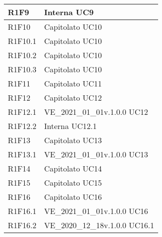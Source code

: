 \begin{center}
\begin{longtable}{|p{22mm}|p{44mm}|}
R1F9 &
Interna \newline
UC9 
\\
\hline

R1F10 &
Capitolato \newline
UC10 
\\
\hline

R1F10.1 &
Capitolato \newline
UC10 
\\
\hline

R1F10.2 &
Capitolato \newline
UC10 
\\
\hline

R1F10.3 &
Capitolato \newline
UC10 
\\
\hline

R1F11 &
Capitolato \newline
UC11 
\\
\hline

R1F12 &
Capitolato \newline
UC12 
\\
\hline

R1F12.1 &
VE\_2021\_01\_01v.1.0.0 \newline
UC12 
\\
\hline

R1F12.2 &
Interna \newline
UC12.1 
\\
\hline

R1F13 &
Capitolato \newline
UC13 
\\
\hline

R1F13.1 &
VE\_2021\_01\_01v.1.0.0 \newline
UC13 
\\
\hline

R1F14 &
Capitolato \newline
UC14 
\\
\hline

R1F15 &
Capitolato \newline
UC15 
\\
\hline

R1F16 &
Capitolato \newline
UC16 
\\
\hline

R1F16.1 &
VE\_2021\_01\_01v.1.0.0 \newline
UC16 
\\
\hline

R1F16.2 &
VE\_2020\_12\_18v.1.0.0 \newline
UC16.1 
\\
\hline


\end{longtable}
\end{center}
